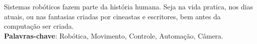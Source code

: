 
\begin{resumo}[RESUMO]
\begin{SingleSpacing}

Sistemas robóticos fazem parte da história humana. Seja na vida pratica, nos dias atuais, ou nas fantasias criadas por cineastas e escritores, bem antes da computação ser criada.\\

\textbf{Palavras-chave}: Robótica, Movimento, Controle, Automação, Câmera.

\end{SingleSpacing}
\end{resumo}


